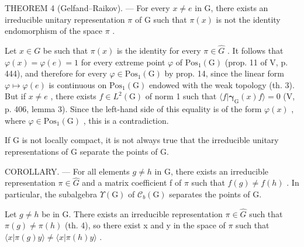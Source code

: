 THEOREM 4 (Gelfand--Raikov). --- For every \(x \neq e\) in G, there exists an irreducible unitary representation \(\pi\) of G such that \(\pi(x)\) is not the identity endomorphism of the space \(\pi\) .

Let \(x \in G\) be such that \(\pi(x)\) is the identity for every \(\pi \in \widehat{G}\) . It follows that \(\varphi(x) = \varphi(e) = 1\) for every extreme point \(\varphi\) of \(\mathrm{Pos}_{1}(\mathrm{G})\) (prop. 11 of V, p. 444), and therefore for every \(\varphi \in \mathrm{Pos}_{1}(\mathrm{G})\) by prop. 14, since the linear form \(\varphi \mapsto \varphi(e)\) is continuous on \(\mathrm{Pos}_{1}(\mathrm{G})\) endowed with the weak topology (th. 3). But if \(x \neq e\) , there exists \(f \in L^{2}(\mathrm{G})\) of norm 1 such that \(\langle f | \boldsymbol{\gamma}_{\mathrm{G}}(x)f \rangle = 0\) (V, p. 406, lemma 3). Since the left-hand side of this equality is of the form \(\varphi(x)\) , where \(\varphi \in \mathrm{Pos}_{1}(\mathrm{G})\) , this is a contradiction.

If G is not locally compact, it is not always true that the irreducible unitary representations of G separate the points of G.

COROLLARY. --- For all elements \(g \neq h\) in G, there exists an irreducible representation \(\pi \in \widehat{G}\) and a matrix coefficient f of \(\pi\) such that \(f(g) \neq f(h)\) . In particular, the subalgebra \(\Upsilon(\mathrm{G})\) of \(\mathcal{C}_{b}(\mathrm{G})\) separates the points of G.

Let \(g \neq h\) be in G. There exists an irreducible representation \(\pi \in \widehat{G}\) such that \(\pi(g) \neq \pi(h)\) (th. 4), so there exist x and y in the space of \(\pi\) such that \(\langle x | \pi(g)y \rangle \neq \langle x | \pi(h)y \rangle\) .

